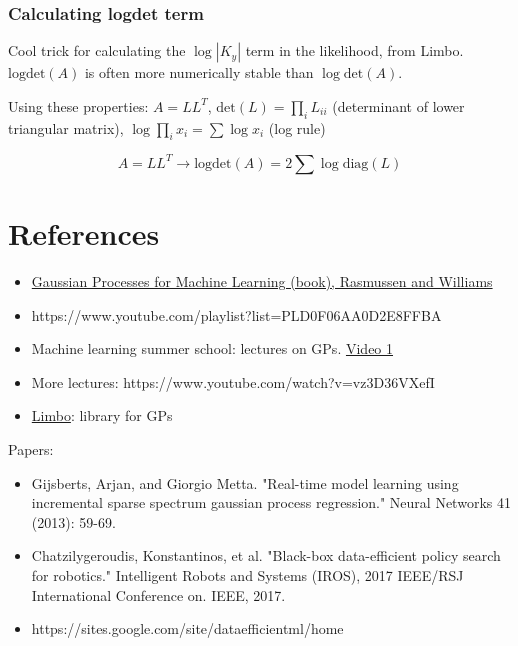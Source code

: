 \documentclass[a4paper]{article}
\begin{document}
\subsubsection*{Calculating logdet term}

Cool trick for calculating the $\log |K_y|$ term in the likelihood, from Limbo. $\text{logdet}(A)$ is often more numerically stable than $\log \text{det} (A)$. 

Using these properties: $A = LL^T$, $\text{det}(L) = \prod_i L_{ii}$ (determinant of lower triangular matrix), $\log \prod_i x_i = \sum \log x_i$ (log rule)

$$A = LL^T \rightarrow \text{logdet}(A) = 2 \sum \log \text{diag}(L)$$


\section{References}

\begin{itemize}
	\item \href{http://www.gaussianprocess.org/gpml/}{Gaussian Processes for Machine Learning (book), Rasmussen and Williams}
	\item https://www.youtube.com/playlist?list=PLD0F06AA0D2E8FFBA 
	\item Machine learning summer school: lectures on GPs. \href{https://www.video.ethz.ch/conferences/2014/rnls/05_thursday/0f8953ea-b1fe-4960-8fa1-ef71bb642445.html}{Video 1} %
	\item More lectures: https://www.youtube.com/watch?v=vz3D36VXefI
	\item \href{https://github.com/resibots/limbo}{Limbo}: library for GPs
\end{itemize}

Papers:

\begin{itemize}
	\item Gijsberts, Arjan, and Giorgio Metta. "Real-time model learning using incremental sparse spectrum gaussian process regression." Neural Networks 41 (2013): 59-69.
	\item Chatzilygeroudis, Konstantinos, et al. "Black-box data-efficient policy search for robotics." Intelligent Robots and Systems (IROS), 2017 IEEE/RSJ International Conference on. IEEE, 2017.
	\item https://sites.google.com/site/dataefficientml/home
\end{itemize}
\end{document}
